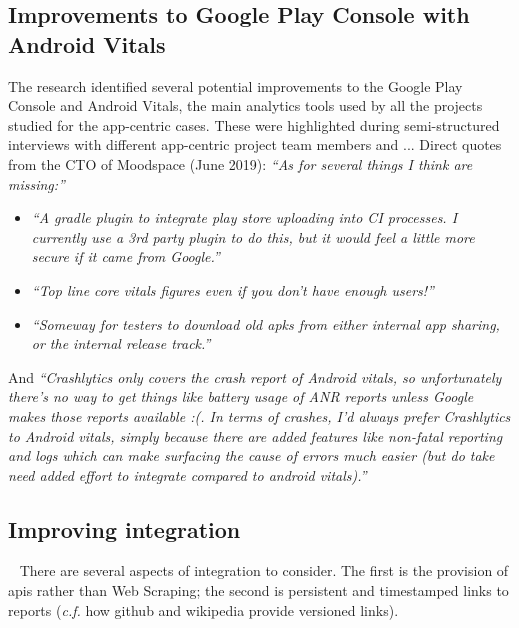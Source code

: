 \subsection{Improvements to Google Play Console with Android Vitals}
The research identified several potential improvements to the Google Play Console and Android Vitals, the main analytics tools used by all the projects studied for the app-centric cases. These were highlighted during semi-structured interviews with different app-centric project team members and ...
Direct quotes from the CTO of Moodspace (June 2019): \emph{``As for several things I think are missing:''}
\begin{itemize}
    \item \textit{``A gradle plugin to integrate play store uploading into CI processes. I currently use a 3rd party plugin to do this, but it would feel a little more secure if it came from Google.''}
    \item \textit{``Top line core vitals figures even if you don't have enough users!''}
    \item \textit{``Someway for testers to download old apks from either internal app sharing, or the internal release track.''}
\end{itemize}

And \emph{``Crashlytics only covers the crash report of Android vitals, so unfortunately there's no way to get things like battery usage of ANR reports unless Google makes those reports available :(. In terms of crashes, I'd always prefer Crashlytics to Android vitals, simply because there are added features like non-fatal reporting and logs which can make surfacing the cause of errors much easier (but do take need added effort to integrate compared to android vitals).''}


\subsection{Improving integration}~\label{tata-improving-integration-topic}
There are several aspects of integration to consider. The first is the provision of \Gls{api}s rather than Web Scraping; the second is persistent and timestamped links to reports (\emph{c.f.} how github and wikipedia provide versioned links).

